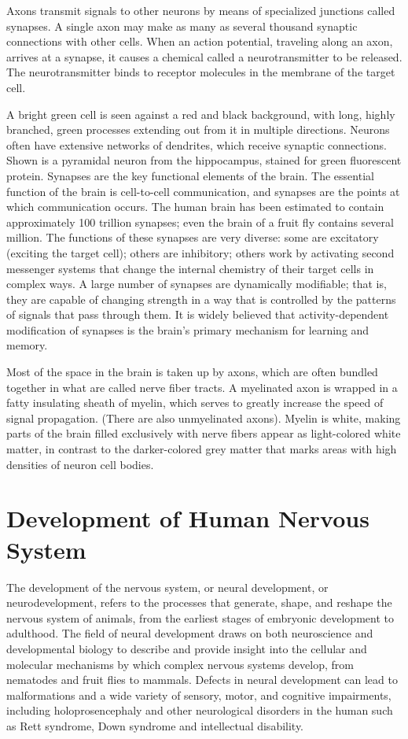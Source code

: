 \documentclass[]{book}
\begin{document}
Axons transmit signals to other neurons by means of specialized junctions called synapses. A single axon may make as many as several thousand synaptic connections with other cells. When an action potential, traveling along an axon, arrives at a synapse, it causes a chemical called a neurotransmitter to be released. The neurotransmitter binds to receptor molecules in the membrane of the target cell.

A bright green cell is seen against a red and black background, with long, highly branched, green processes extending out from it in multiple directions.
Neurons often have extensive networks of dendrites, which receive synaptic connections. Shown is a pyramidal neuron from the hippocampus, stained for green fluorescent protein.
Synapses are the key functional elements of the brain. The essential function of the brain is cell-to-cell communication, and synapses are the points at which communication occurs. The human brain has been estimated to contain approximately 100 trillion synapses; even the brain of a fruit fly contains several million. The functions of these synapses are very diverse: some are excitatory (exciting the target cell); others are inhibitory; others work by activating second messenger systems that change the internal chemistry of their target cells in complex ways. A large number of synapses are dynamically modifiable; that is, they are capable of changing strength in a way that is controlled by the patterns of signals that pass through them. It is widely believed that activity-dependent modification of synapses is the brain's primary mechanism for learning and memory.

Most of the space in the brain is taken up by axons, which are often bundled together in what are called nerve fiber tracts. A myelinated axon is wrapped in a fatty insulating sheath of myelin, which serves to greatly increase the speed of signal propagation. (There are also unmyelinated axons). Myelin is white, making parts of the brain filled exclusively with nerve fibers appear as light-colored white matter, in contrast to the darker-colored grey matter that marks areas with high densities of neuron cell bodies.

\hypertarget{development-of-human-nervous-system}{%
\chapter{Development of Human Nervous System}\label{development-of-human-nervous-system}}

The development of the nervous system, or neural development, or neurodevelopment, refers to the processes that generate, shape, and reshape the nervous system of animals, from the earliest stages of embryonic development to adulthood. The field of neural development draws on both neuroscience and developmental biology to describe and provide insight into the cellular and molecular mechanisms by which complex nervous systems develop, from nematodes and fruit flies to mammals. Defects in neural development can lead to malformations and a wide variety of sensory, motor, and cognitive impairments, including holoprosencephaly and other neurological disorders in the human such as Rett syndrome, Down syndrome and intellectual disability.
\end{document}
